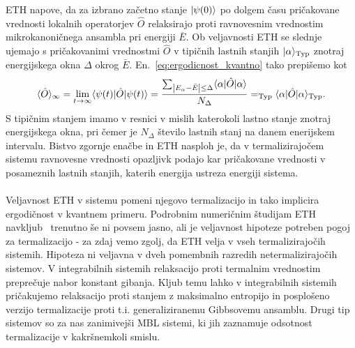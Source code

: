 \documentclass[10pt,a4paper]{article}
\begin{document}
ETH napove, da za izbrano začetno stanje $\vert\psi(0)\rangle$ po dolgem času pričakovane vrednosti lokalnih operatorjev $\hat{O}$ relaksirajo proti ravnovesnim vrednostim mikrokanoničnega ansambla pri energiji $\bar{E}.$ Ob veljavnosti ETH se slednje ujemajo s pričakovanimi vrednostmi $\hat{O}$ v tipičnih lastnih stanjih $\vert\alpha\rangle_\mathrm{Typ}$ znotraj energijskega okna $\Delta$ okrog $\bar{E}$. En.~\eqref{eq:ergodicnost_kvantno} tako prepišemo kot
\begin{equation}
\langle \hat{O}\rangle_\infty=\lim_{t\to\infty}\langle \psi(t) \vert\hat{O}\vert\psi(t)\rangle=\frac{\sum_{\left| E_\alpha - \bar{E} \right|\leq \Delta}\langle \alpha \vert\hat{O}\vert\alpha\rangle}{N_\Delta}=_\mathrm{Typ}\langle \alpha \vert\hat{O}\vert\alpha\rangle_\mathrm{Typ}.
\end{equation}
S tipičnim stanjem imamo v resnici v mislih katerokoli lastno stanje znotraj energijskega okna, pri čemer je $N_\Delta$ število lastnih stanj na danem enerijskem intervalu. Bistvo zgornje enačbe in ETH nasploh je, da v termalizirajočem sistemu ravnovesne vrednosti opazljivk podajo kar pričakovane vrednosti v posameznih lastnih stanjih, katerih energija ustreza energiji sistema. \\\\
Veljavnost ETH v sistemu pomeni njegovo termalizacijo in tako implicira ergodičnost v kvantnem primeru. Podrobnim numeričnim študijam ETH navkljub~\cite{d2016quantum} trenutno še ni povsem jasno, ali je veljavnost hipoteze potreben pogoj za termalizacijo - za zdaj vemo zgolj, da ETH velja v vseh termalizirajočih sistemih. Hipoteza ni veljavna v dveh pomembnih razredih netermalizirajočih sistemov. V integrabilnih sistemih relaksacijo proti termalnim vrednostim preprečuje nabor konstant  gibanja. Kljub temu lahko v integrabilnih sistemih pričakujemo relaksacijo proti stanjem z maksimalno entropijo in posplošeno verzijo termalizacije proti t.i. generaliziranemu Gibbsovemu ansamblu. Drugi tip sistemov so za nas zanimivejši MBL sistemi, ki jih zaznamuje odsotnost termalizacije v kakršnemkoli smislu. 
\end{document}
